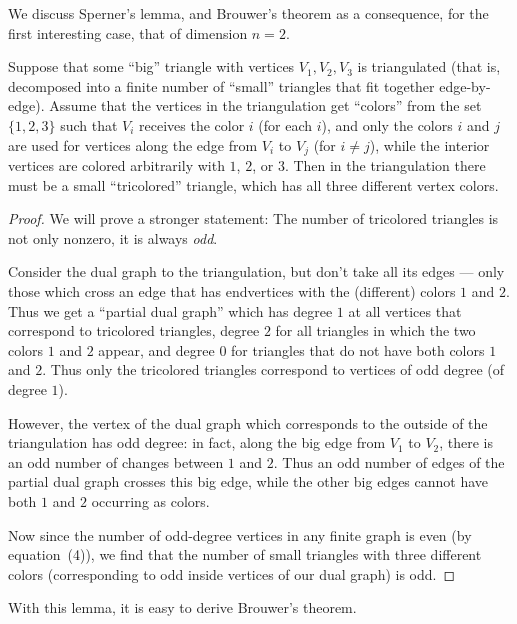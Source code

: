 We discuss Sperner's lemma, and Brouwer's theorem as a consequence, for
the first interesting case, that of dimension $n = 2$.

\begin{lemma}
  \label{sperner}
  Suppose that some ``big'' triangle with vertices $V_1, V_2, V_3$ is triangulated
  (that is, decomposed into a finite number of ``small'' triangles that fit together edge-by-edge).
  Assume that the vertices in the triangulation get ``colors'' from the set $\{1, 2, 3\}$ such that
  $V_i$ receives the color $i$ (for each $i$), and only the colors $i$ and $j$ are used for vertices
  along the edge from $V_i$ to $V_j$ (for $i \neq j$), while the interior vertices are colored
  arbitrarily with $1$, $2$, or $3$.
  Then in the triangulation there must be a small ``tricolored'' triangle, which has all three
  different vertex colors.
\end{lemma}
\begin{proof}
  \leanok
  We will prove a stronger statement: The number of tricolored triangles is not only nonzero,
  it is always \emph{odd}.

  Consider the dual graph to the triangulation, but don't take all its edges
  --- only those which cross an edge that has endvertices with the (different)
  colors $1$ and $2$. Thus we get a ``partial dual graph'' which has degree $1$ at all
  vertices that correspond to tricolored triangles, degree $2$ for all triangles in
  which the two colors $1$ and $2$ appear, and degree $0$ for triangles that do not
  have both colors $1$ and $2$. Thus only the tricolored triangles correspond to
  vertices of odd degree (of degree $1$).

  However, the vertex of the dual graph which corresponds to the outside of
  the triangulation has odd degree: in fact, along the big edge from $V_1$ to $V_2$,
  there is an odd number of changes between $1$ and $2$. Thus an odd number
  of edges of the partial dual graph crosses this big edge, while the other big
  edges cannot have both $1$ and $2$ occurring as colors.

  Now since the number of odd-degree vertices in any finite graph is even (by
  equation~(4)), we find that the number of small triangles with three different
  colors (corresponding to odd inside vertices of our dual graph) is odd.
\end{proof}

With this lemma, it is easy to derive Brouwer's theorem.

